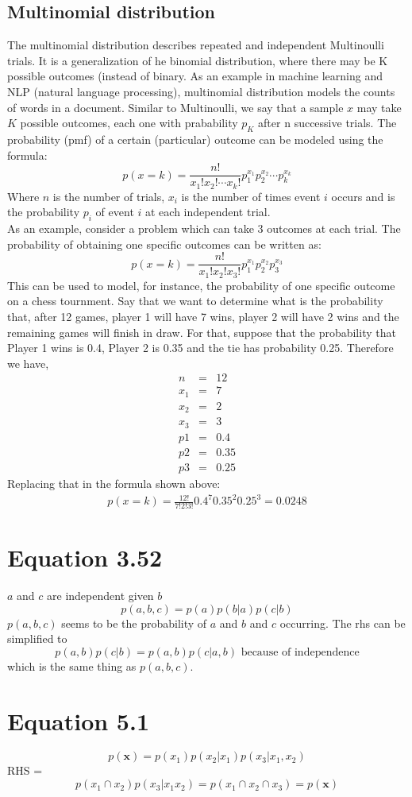 \documentclass{article}
\newcommand{\beq}{\begin{equation}}
\newcommand{\eeq}{\end{equation}}
\newcommand{\ber}{\begin{eqnarray}}
\newcommand{\eer}{\end{eqnarray}}
\begin{document}
\subsection{Multinomial distribution}
The multinomial distribution describes repeated and independent Multinoulli trials. It is a generalization of he binomial distribution, where there may be K possible outcomes (instead of binary. As an example in machine learning and NLP (natural language processing), multinomial distribution models the counts of words in a document. Similar to Multinoulli, we say that a sample $x$ may take $K$ possible outcomes, each one with prabability $p_K$ after n successive trials. The probability (pmf) of a certain (particular) outcome can be modeled using the formula:
\beq
p(x=k) = \frac{n!}{x_1!x_2!\cdots x_k!}p_1^{x_1}p_2^{x_2}\cdots{p_k^{x_k}}
\eeq
Where $n$ is the number of trials, $x_i$ is the number of times event $i$ occurs and is the probability $p_i$ of event $i$ at each independent trial.\\
As an example, consider a problem which can take 3 outcomes at each trial. The probability of obtaining one specific outcomes can be written as:
\beq
p(x=k) = \frac{n!}{x_1!x_2!x_3!}p_1^{x_1}p_2^{x_2}p_3^{x_3}
\eeq
This can be used to model, for instance, the probability of one specific outcome on a chess tournment. Say that we want to determine what is the probability that, after 12 games, player 1 will have 7 wins, player 2 will have 2 wins and the remaining games will finish in draw. For that, suppose that the probability that Player 1 wins is 0.4, Player 2 is 0.35 and the tie has probability 0.25. Therefore we have,
\ber
n &=& 12\\
x_1 &=& 7\\
x_2 &=& 2\\
x_3 &=& 3 \\
p1  &=& 0.4\\
p2  &=& 0.35\\
p3  &=& 0.25
\eer
Replacing that in the formula shown above:
\ber
p(x=k) = \frac{12!}{7!2!3!}{0.4}^7{0.35}^2{0.25}^3 = 0.0248
\eer
\section{Equation 3.52}
$a$ and $c$ are independent given $b$
\beq
p(a,b,c) = p(a)p(b|a)p(c|b)
\eeq
$p(a,b,c)$ seems to be the probability of $a$ and $b$ and $c$ occurring. The rhs can be simplified to
\beq
p(a,b)p(c|b) = p(a,b)p(c|a,b)  \text{ because of independence}
\eeq
which is the same thing as $p(a,b,c)$.
\section{Equation 5.1}
\beq
p(\mathbf{x}) = p(x_1)p(x_2|x_1)p(x_3|x_1,x_2)
\eeq
RHS =
\beq
p(x_1\cap x_2)p(x_3|x_1x_2) = p(x_1\cap x_2 \cap x_3) = p(\mathbf{x})
\eeq
\end{document}
